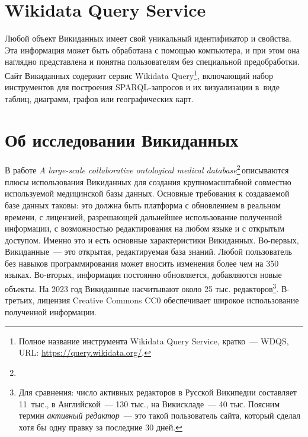 \section{Wikidata Query Service}
\label{sect:WDQS}

Любой объект Викиданных имеет свой уникальный идентификатор и свойства. 
Эта информация может быть обработана с помощью компьютера, 
и при этом она наглядно представлена и понятна пользователям без специальной предобработки. 
Сайт Викиданных содержит сервис Wikidata Query\footnote{%
%
Полное название инструмента Wikidata Query Service, кратко~--- WDQS, URL: 
\href{https://query.wikidata.org/}{https://query.wikidata.org/}.%
%
}, включающий набор инструментов для построения SPARQL-запросов 
и их визуализации в~виде таблиц, диаграмм, графов или географических карт.




\section{Об исследовании Викиданных}

В работе \textit{A large-scale collaborative ontological medical database}\footnote{%
}\,описываются плюсы использования Викиданных для создания крупномасштабной 
совместно используемой медицинской базы данных. 
Основные требования к создаваемой базе данных таковы: 
это должна быть платформа с обновлением в реальном времени, 
с лицензией, разрешающей дальнейшее использование полученной информации, 
с возможностью редактирования на любом языке и с открытым доступом. 
Именно это и есть основные характеристики Викиданных. 
Во-первых, Викиданные~--- это открытая, редактируемая база знаний. 
Любой пользователь без навыков программирования может вносить изменения 
более чем на 350 языках. 
Во-вторых, информация постоянно обновляется, добавляются новые объекты. 
На 2023 год Викиданные насчитывают около 25 тыс. редакторов\footnote{Для сравнения: 
число активных редакторов в Русской Википедии 
составляет 11~тыс., в Английской~--- 130 тыс., на Викискладе~--- 40 тыс. 
Поясним термин \emph{активный редактор}~--- это такой пользователь сайта, который сделал хотя бы одну правку за последние 30 дней.}. 
В-третьих, лицензия Creative Commons CC0 обеспечивает широкое использование полученной информации. 

